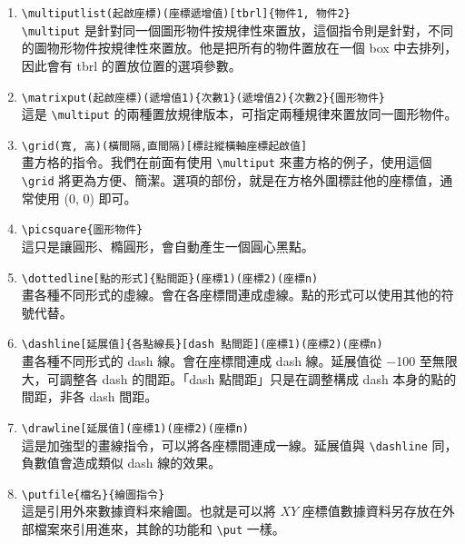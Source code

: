 \begin{enumerate}
  \item \verb|\multiputlist(起啟座標)(座標遞增值)[tbrl]{物件1, 物件2|\chdots\verb|}|\\
        \verb|\multiput| 是針對同一個圖形物件按規律性來置放，這個指令則是針對，不同的圖物形物件按規律性來置放。他是把所有的物件置放在一個 box 中去排列，因此會有 {\ttfamily tbrl} 的置放位置的選項參數。

  \item \verb|\matrixput(起啟座標)(遞增值1){次數1}(遞增值2){次數2}{圖形物件}|\\
        這是 \verb|\multiput| 的兩種置放規律版本，可指定兩種規律來置放同一圖形物件。

  \item \verb|\grid(寬, 高)(橫間隔,直間隔)[標註縱橫軸座標起啟值]|\\
        畫方格的指令。我們在前面有使用 \verb|\multiput| 來畫方格的例子，使用這個 \verb|\grid| 將更為方便、簡潔。選項的部份，就是在方格外圍標註他的座標值，通常使用 (0, 0) 即可。

  \item \verb|\picsquare{圖形物件}|\\
        這只是讓圓形、橢圓形，會自動產生一個圓心黑點。

  \item \verb|\dottedline[點的形式]{點間距}(座標1)(座標2)|\chdots\verb|(座標n)|\\
        畫各種不同形式的虛線。會在各座標間連成虛線。點的形式可以使用其他的符號代替。

  \item \verb|\dashline[延展值]{各點線長}[dash 點間距](座標1)(座標2)|\chdots\verb|(座標n)|\\
        畫各種不同形式的 dash 線。會在座標間連成 dash 線。延展值從 $-$100 至無限大，可調整各 dash 的間距。「dash 點間距」只是在調整構成 dash 本身的點的間距，非各 dash 間距。

  \item \verb|\drawline[延展值](座標1)(座標2)|\chdots\verb|(座標n)|\\
        這是加強型的畫線指令，可以將各座標間連成一線。延展值與 \verb|\dashline| 同，負數值會造成類似 dash 線的效果。

  \item \verb|\putfile{檔名}{繪圖指令}|\\
        這是引用外來數據資料來繪圖。也就是可以將 $XY$ 座標值數據資料另存放在外部檔案來引用進來，其餘的功能和 \verb|\put| 一樣。
\end{enumerate}

